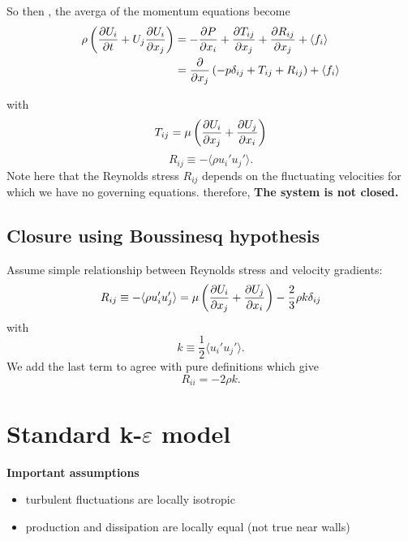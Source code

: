 \documentclass{article}
\let\epsilon\varepsilon
\begin{document}
So then , the averga of the momentum equations become 
\begin{equation}
	\begin{split}
		\rho \left(\pdv{U_{i}}{t}+U_{j}\pdv{U_{i}}{x_{j}}\right) &= -\pdv{P}{x_{i}} + \pdv{T_{ij}}{x_{j}} + \pdv{R_{ij}}{x_{j}} + \langle f_{i}\rangle \\&= \pdv{x_{j}}\left(-p\delta_{ij} + T_{ij} + R_{ij}\right) + \langle f_{i}\rangle
	\end{split}
\end{equation}

with 
\begin{equation}
	T_{ij} = \mu \left(\pdv{U_{i}}{x_{j}} + \pdv{U_{j}}{x_{i}}\right)
\end{equation}
\begin{equation}
	R_{ij} \equiv -\langle \rho u_{i}'u_{j}'\rangle.
\end{equation}
Note here that the Reynolds stress $R_{ij}$ depends on the fluctuating velocities for which we have no governing equations. therefore, \textbf{The system is not closed.}

\subsection{Closure using Boussinesq hypothesis}
Assume simple relationship between Reynolds stress and velocity gradients: 
\begin{equation}
	R_{ij} \equiv -\langle\rho u_{i}'u_{j}'\rangle = \mu \left(\pdv{U_{i}}{x_{j}} +\pdv{U_{j}}{x_{i}} \right)- \frac{2}{3}\rho k \delta_{ij}
\end{equation}
with 
\begin{equation}
	k \equiv \frac{1}{2}\langle u_{i}'u_{j}'\rangle.
\end{equation}
We add the last term to agree with pure definitions which give 
\begin{equation}
	R_{ii} = -2\rho k.
\end{equation}


\section{Standard k-$\epsilon$ model}



\textbf{Important assumptions}
\begin{itemize}
	\item turbulent fluctuations are locally isotropic
	\item production and dissipation are locally equal (not true near walls)
\end{itemize}
\end{document}
